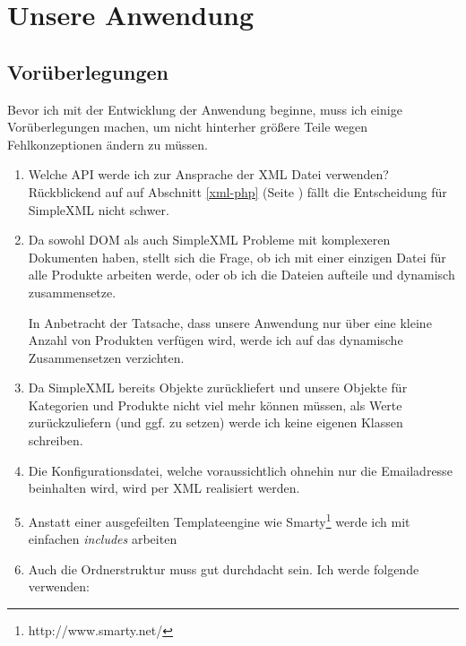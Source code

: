 \chapter{Unsere Anwendung}
\section{Vorüberlegungen}
Bevor ich mit der Entwicklung der Anwendung beginne, muss ich einige
Vorüberlegungen machen, um nicht hinterher größere Teile wegen
Fehlkonzeptionen ändern zu müssen.

\begin{enumerate}
   \item Welche API werde ich zur Ansprache der XML Datei verwenden?
  Rückblickend auf auf Abschnitt \ref{xml-php} (Seite \pageref{xml-php})
  fällt die Entscheidung für SimpleXML nicht schwer.

   \item Da sowohl DOM als auch SimpleXML Probleme mit komplexeren Dokumenten
  haben, stellt sich die Frage, ob ich mit einer einzigen Datei für alle Produkte
  arbeiten werde, oder ob ich die Dateien aufteile und dynamisch zusammensetze.

  In Anbetracht der Tatsache, dass unsere Anwendung nur über eine kleine
  Anzahl von Produkten verfügen wird, werde ich auf das dynamische Zusammensetzen
  verzichten.
   \item Da SimpleXML bereits Objekte zurückliefert und unsere Objekte für Kategorien
  und Produkte nicht viel mehr können müssen, als Werte zurückzuliefern (und ggf. zu setzen)
  werde ich keine eigenen Klassen schreiben.

   \item Die Konfigurationsdatei, welche voraussichtlich ohnehin nur die Emailadresse
  beinhalten wird, wird per XML realisiert werden.

   \item Anstatt einer ausgefeilten Templateengine wie Smarty\footnote{http://www.smarty.net/} werde ich mit
  einfachen {\em includes} arbeiten

   \item Auch die Ordnerstruktur muss gut durchdacht sein. Ich werde folgende verwenden:
\end{enumerate}
